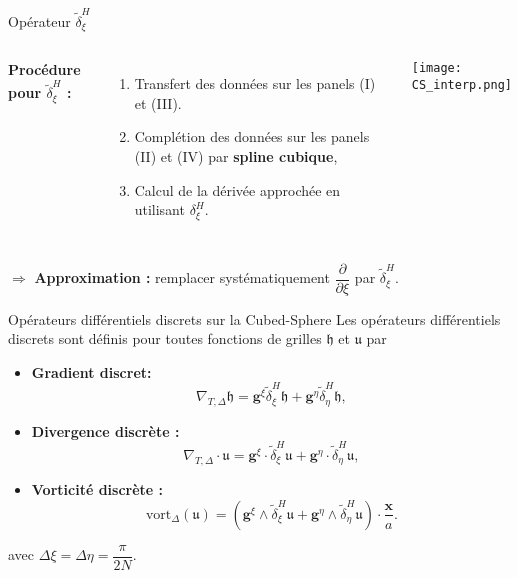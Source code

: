 \documentclass[11pt]{beamer}
\def\dxi{\tilde{\delta}^H_{\xi}}
\def\deta{\tilde{\delta}^H_{\eta}}
\begin{document}
\begin{frame}{Opérateur $\dxi$}
\begin{columns}
\textbf{Procédure pour $\dxi$ :}
\begin{enumerate}
\item Transfert des données sur les panels (I) et (III).
\item Complétion des données sur les panels (II) et (IV) par \textbf{spline cubique},
\item Calcul de la dérivée approchée en utilisant $\delta_{\xi}^H$.
\end{enumerate}
\begin{center}
\texttt{[image: CS\_interp.png]}
\end{center}
\end{columns}
$\Rightarrow$ \textbf{Approximation :} remplacer systématiquement $\dfrac{\partial}{\partial \xi}$ par $\dxi$.
\end{frame}


















\begin{frame}{Opérateurs différentiels discrets sur la Cubed-Sphere}
Les opérateurs différentiels discrets sont définis pour toutes fonctions de grilles $\mathfrak{h}$ et $\mathfrak{u}$ par
\begin{block}{}
\begin{itemize}
\item \textbf{Gradient discret:}
$$
\nabla_{T,\Delta} \mathfrak{h} = \mathbf{g}^{\xi} \dxi \mathfrak{h} + \mathbf{g}^{\eta} \deta \mathfrak{h},
$$
\item \textbf{Divergence discrète :}
$$
\nabla_{T,\Delta} \cdot \mathfrak{u} = \mathbf{g}^{\xi} \cdot \dxi \mathfrak{u} + \mathbf{g}^{\eta} \cdot \deta \mathfrak{u},
$$
\item \textbf{Vorticité discrète :}
$$
\text{vort}_{\Delta} (\mathfrak{u}) = \left( \mathbf{g}^{\xi} \wedge \dxi \mathfrak{u} + \mathbf{g}^{\eta} \wedge \deta \mathfrak{u} \right) \cdot \dfrac{\mathbf{x}}{a}.
$$
\end{itemize}
avec $\Delta \xi = \Delta \eta = \dfrac{\pi}{2N}$.
\end{block}
\end{frame}
\end{document}
